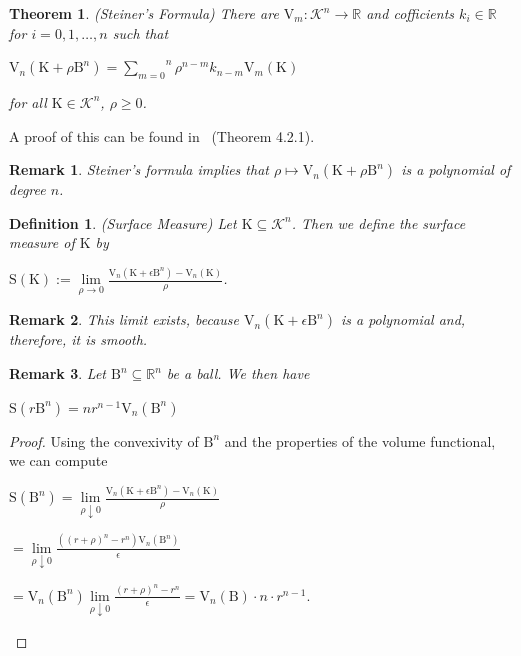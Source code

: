 \documentclass[a4paper]{book}
\newtheorem{theorem}{Theorem}%
\newtheorem{remark}{Remark}%
\newtheorem{definition}{Definition}%
\begin{document}
\begin{theorem}(Steiner's Formula)
    There are $\mathrm{V}_{m}:\mathscr{K}^{n}\to\mathbb{R}$ and cofficients $k_i\in\mathbb{R}$ for $i=0,1,\dots,n$ such that 
    \begin{center}
        $\mathrm{V}_{n}(\mathrm{K}+\rho\mathrm{B}^{n})=\overset{n}{\underset{m=0}{\sum}}\rho^{n-m}k_{n-m}\mathrm{V}_{m}(\mathrm{K})$
    \end{center}
    for all $\mathrm{K}\in\mathscr{K}^{n}$, $\rho\geq0$.
\end{theorem}
A proof of this can be found in~\cite{schneider2014convex} (Theorem 4.2.1).

\begin{remark}
    Steiner’s formula implies that $\rho\mapsto\mathrm{V}_{n}(\mathrm{K}+\rho\mathrm{B}^{n})$ is a polynomial of degree $n$.
\end{remark}

\begin{definition} (Surface Measure)
    Let $\mathrm{K}\subseteq\mathscr{K}^{n}$. Then we define the \textit{surface measure} of $\mathrm{K}$ by
    \begin{center}
        $\mathrm{S}(\mathrm{K}):=\underset{\rho\to0}{\lim}\frac{\mathrm{V}_{n}(\mathrm{K}+\epsilon\mathrm{B}^{n})-\mathrm{V}_{n}(\mathrm{K})}{\rho}$.
    \end{center}
\end{definition}

\begin{remark}
    This limit exists, because $\mathrm{V}_{n}(\mathrm{K}+\epsilon\mathrm{B}^{n})$ is a polynomial and, therefore, it is smooth.
\end{remark}

\begin{remark}
    Let $\mathrm{B}^{n}\subseteq\mathbb{R}^{n}$ be a ball. We then have
    \begin{center}
        $\mathrm{S}(r\mathrm{B}^{n})=nr^{n-1}\mathrm{V}_{n}(\mathrm{B}^{n})$
    \end{center}
\end{remark}
\begin{proof}
    Using the convexivity of $\mathrm{B}^{n}$ and the properties of the volume functional, we can compute
    \begin{center}
        $\displaystyle \mathrm{S}(\mathrm{B}^{n})=\underset{\rho\downarrow0}{\lim}\frac{\mathrm{V}_{n}(\mathrm{K}+\epsilon\mathrm{B}^{n})-\mathrm{V}_{n}(\mathrm{K})}{\rho}$

        $\displaystyle =\underset{\rho\downarrow0}{\lim}\frac{((r+\rho)^{n}-r^{n})\mathrm{V}_{n}(\mathrm{B}^{n})}{\epsilon}$

        $\displaystyle =\mathrm{V}_{n}(\mathrm{B}^{n})\underset{\rho\downarrow0}{\lim}\frac{(r+\rho)^{n}-r^{n}}{\epsilon}=\mathrm{V}_{n}(\mathrm{B})\cdot n\cdot r^{n−1}$.
    \end{center}
\end{proof}
\end{document}
